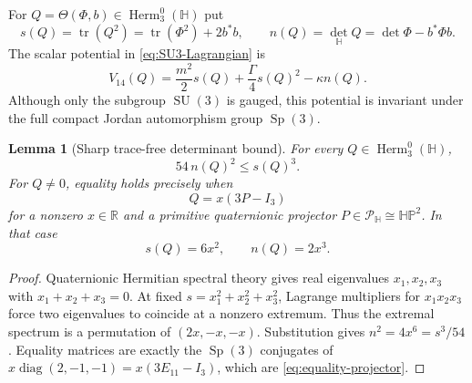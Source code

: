 \documentclass[11pt]{article}
\newtheorem{lemma}[theorem]{Lemma}
\theoremstyle{definition}
\theoremstyle{remark}
\newcommand{\R}{\mathbb R}
\newcommand{\Hh}{\mathbb H}
\newcommand{\HP}{\mathbb{HP}}
\newcommand{\Herm}{\operatorname{Herm}}
\newcommand{\tr}{\operatorname{tr}}
\newcommand{\diag}{\operatorname{diag}}
\newcommand{\Sp}{\operatorname{Sp}}
\newcommand{\SU}{\operatorname{SU}}
\begin{document}
For $Q=\Theta(\Phi,b)\in\Herm_3^0(\Hh)$ put
\begin{equation}\label{eq:s-and-n}
 s(Q)=\tr(Q^2)=\tr(\Phi^2)+2b^*b,
 \qquad n(Q)=\det_{\Hh}Q=\det\Phi-b^*\Phi b.
\end{equation}
The scalar potential in \eqref{eq:SU3-Lagrangian} is
\begin{equation}\label{eq:V14}
 V_{14}(Q)=\frac{m^2}{2}s(Q)+\frac{\Gamma}{4}s(Q)^2-\kappa n(Q).
\end{equation}
Although only the subgroup $\SU(3)$ is gauged, this potential is invariant
under the full compact Jordan automorphism group $\Sp(3)$.

\begin{lemma}[Sharp trace-free determinant bound]\label{lem:det-bound}
For every $Q\in\Herm_3^0(\Hh)$,
\begin{equation}\label{eq:det-bound}
 \boxed{54\,n(Q)^2\leq s(Q)^3.}
\end{equation}
For $Q\neq0$, equality holds precisely when
\begin{equation}\label{eq:equality-projector}
 Q=x(3P-I_3)
\end{equation}
for a nonzero $x\in\R$ and a primitive quaternionic projector
$P\in\mathcal P_{\Hh}\cong\HP^2$.  In that case
\[
 s(Q)=6x^2,
 \qquad n(Q)=2x^3.
\]
\end{lemma}

\begin{proof}
Quaternionic Hermitian spectral theory gives real eigenvalues
$x_1,x_2,x_3$ with $x_1+x_2+x_3=0$.  At fixed
$s=x_1^2+x_2^2+x_3^2$, Lagrange multipliers for
$x_1x_2x_3$ force two eigenvalues to coincide at a nonzero extremum.  Thus the
extremal spectrum is a permutation of $(2x,-x,-x)$.  Substitution gives
$n^2=4x^6=s^3/54$.  Equality matrices are exactly the $\Sp(3)$ conjugates of
$x\diag(2,-1,-1)=x(3E_{11}-I_3)$, which are
\eqref{eq:equality-projector}.
\end{proof}
\end{document}
